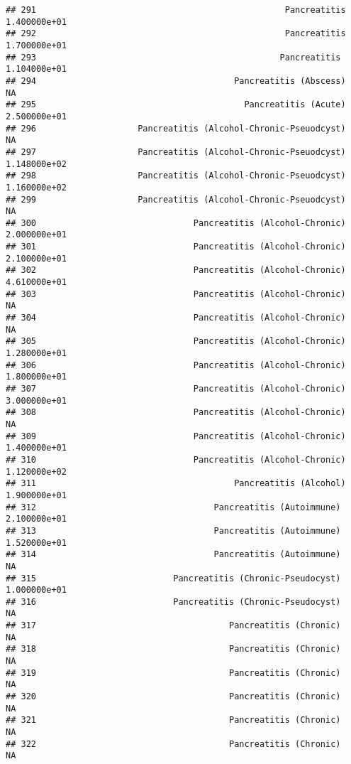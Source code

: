 \documentclass[
]{article}
\begin{document}
\begin{verbatim}
## 291                                                 Pancreatitis  1.400000e+01
## 292                                                 Pancreatitis  1.700000e+01
## 293                                                Pancreatitis   1.104000e+01
## 294                                       Pancreatitis (Abscess)            NA
## 295                                         Pancreatitis (Acute)  2.500000e+01
## 296                    Pancreatitis (Alcohol-Chronic-Pseuodcyst)            NA
## 297                    Pancreatitis (Alcohol-Chronic-Pseuodcyst)  1.148000e+02
## 298                    Pancreatitis (Alcohol-Chronic-Pseuodcyst)  1.160000e+02
## 299                    Pancreatitis (Alcohol-Chronic-Pseuodcyst)            NA
## 300                               Pancreatitis (Alcohol-Chronic)  2.000000e+01
## 301                               Pancreatitis (Alcohol-Chronic)  2.100000e+01
## 302                               Pancreatitis (Alcohol-Chronic)  4.610000e+01
## 303                               Pancreatitis (Alcohol-Chronic)            NA
## 304                               Pancreatitis (Alcohol-Chronic)            NA
## 305                               Pancreatitis (Alcohol-Chronic)  1.280000e+01
## 306                               Pancreatitis (Alcohol-Chronic)  1.800000e+01
## 307                               Pancreatitis (Alcohol-Chronic)  3.000000e+01
## 308                               Pancreatitis (Alcohol-Chronic)            NA
## 309                               Pancreatitis (Alcohol-Chronic)  1.400000e+01
## 310                               Pancreatitis (Alcohol-Chronic)  1.120000e+02
## 311                                       Pancreatitis (Alcohol)  1.900000e+01
## 312                                   Pancreatitis (Autoimmune)   2.100000e+01
## 313                                   Pancreatitis (Autoimmune)   1.520000e+01
## 314                                   Pancreatitis (Autoimmune)             NA
## 315                           Pancreatitis (Chronic-Pseudocyst)   1.000000e+01
## 316                           Pancreatitis (Chronic-Pseudocyst)             NA
## 317                                      Pancreatitis (Chronic)             NA
## 318                                      Pancreatitis (Chronic)             NA
## 319                                      Pancreatitis (Chronic)             NA
## 320                                      Pancreatitis (Chronic)             NA
## 321                                      Pancreatitis (Chronic)             NA
## 322                                      Pancreatitis (Chronic)             NA

\end{verbatim}
\end{document}
